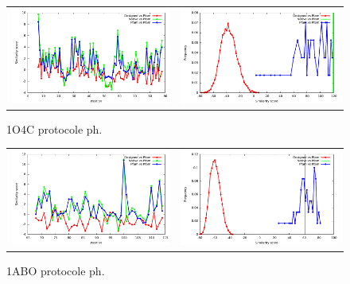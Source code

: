 \documentclass[a4paper,12pt]{article}
\begin{document}
   \begin{figure}[t]
     \centering
     \begin{tabular}{cc}
       \includegraphics[width=8.45cm]{gen_08032012/1O4C/ph/similarity_bypos.pdf} &
       \includegraphics[width=8.45cm]{gen_08032012/1O4C/ph/similarity_byseq_frequency.pdf} \\
     \end{tabular}
     
     \caption{1O4C protocole ph.}
     \label{1ABO}
   \end{figure}
   \begin{figure}[t]
     \centering
     \begin{tabular}{cc}
       \includegraphics[width=8.45cm]{gen_08032012/1ABO/ph/similarity_bypos.pdf} &
       \includegraphics[width=8.45cm]{gen_08032012/1ABO/ph/similarity_byseq_frequency.pdf} \\
     \end{tabular}
     
     \caption{1ABO protocole ph.}
     \label{1ABO}
   \end{figure}
\end{document}

